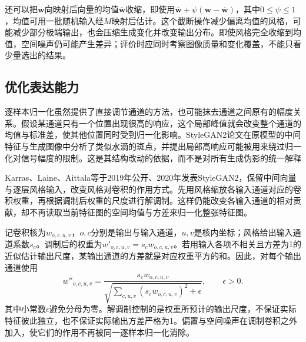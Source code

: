还可以把$\bm{w}$向映射后向量的均值$\overline{\bm{w}}$收缩，即使用$\overline{\bm{w}}+\psi(\bm{w}-\overline{\bm{w}})$，其中$0\leq\psi\leq1$，均值可用一批随机输入经$M$映射后估计。这个截断操作减少偏离均值的风格，可能减少部分极端输出，也会压缩生成变化并改变输出分布。即使风格完全收缩到均值，空间噪声仍可能产生差异；评价时应同时考察图像质量和变化覆盖，不能只看少量选出的结果。

\subsection{优化表达能力}
\label{sec:neural-generative-stylegan-expression-extension}

逐样本归一化虽然提供了直接调节通道的方法，也可能抹去通道之间原有的幅度关系。假设某通道只有一个位置出现很高的响应，这个局部峰值就会改变整个通道的均值与标准差，使其他位置同时受到归一化影响。StyleGAN2论文在原模型的中间特征与生成图像中分析了类似水滴的斑点，并提出局部高响应可能被用来绕过归一化对信号幅度的限制。这是其结构改动的依据，而不是对所有生成伪影的统一解释

Karras、Laine、Aittala等于2019年公开、2020年发表StyleGAN2，保留中间向量与逐层风格输入，改变风格对卷积的作用方式。先用风格缩放各输入通道对应的卷积权重，再根据调制后权重的尺度进行解调制。这样仍能改变各输入通道的相对贡献，却不再读取当前特征图的空间均值与方差来归一化整张特征图。

记卷积核为$w_{o,c,u,v}$，$o,c$分别是输出与输入通道，$u,v$是核内坐标；风格给出输入通道系数$s_c$。调制后的权重为$w'_{o,c,u,v}=s_cw_{o,c,u,v}$。若用输入各项不相关且方差为1的近似估计输出尺度，某输出通道的方差就是对应权重平方的和。因此，对每个输出通道使用
\begin{equation}
  \label{eq:neural-generative-stylegan-demodulation}
  w''_{o,c,u,v}
    =\frac{s_cw_{o,c,u,v}}
      {\sqrt{\sum_{c,u,v}(s_cw_{o,c,u,v})^2+\epsilon}},
      \qquad\epsilon>0.
\end{equation}
其中小常数$\epsilon$避免分母为零。解调制控制的是权重所预计的输出尺度，不保证实际特征彼此独立，也不保证实际输出方差严格为1。偏置与空间噪声在调制卷积之外加入，使它们的作用不再被同一逐样本归一化消除。

